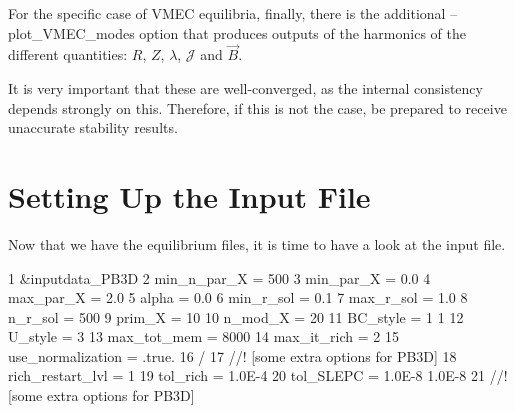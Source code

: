 For the specific case of V\+M\+EC equilibria, finally, there is the additional {\ttfamily --plot\+\_\+\+V\+M\+E\+C\+\_\+modes} option that produces outputs of the harmonics of the different quantities\+: $R$, $Z$, $\lambda$, $\mathcal{J}$ and $\vec{B}$.

It is very important that these are well-\/converged, as the internal consistency depends strongly on this. Therefore, if this is not the case, be prepared to receive unaccurate stability results.\hypertarget{page_tutorial_tutorial_inputs}{}\section{Setting Up the Input File}\label{page_tutorial_tutorial_inputs}
Now that we have the equilibrium files, it is time to have a look at the input file.


\begin{DoxyCodeInclude}
1 &inputdata\_PB3D
2     min\_n\_par\_X             = 500
3     min\_par\_X               = 0.0
4     max\_par\_X               = 2.0
5     alpha                   = 0.0
6     min\_r\_sol               = 0.1
7     max\_r\_sol               = 1.0
8     n\_r\_sol                 = 500
9     prim\_X                  = 10
10     n\_mod\_X                 = 20
11     BC\_style                = 1 1
12     U\_style                 = 3
13     max\_tot\_mem             = 8000
14     max\_it\_rich             = 2
15     use\_normalization       = .true.
16 /
17 //! [some extra options for PB3D]
18     rich\_restart\_lvl        = 1
19     tol\_rich                = 1.0E-4
20     tol\_SLEPC               = 1.0E-8 1.0E-8
21 //! [some extra options for PB3D]
\end{DoxyCodeInclude}


